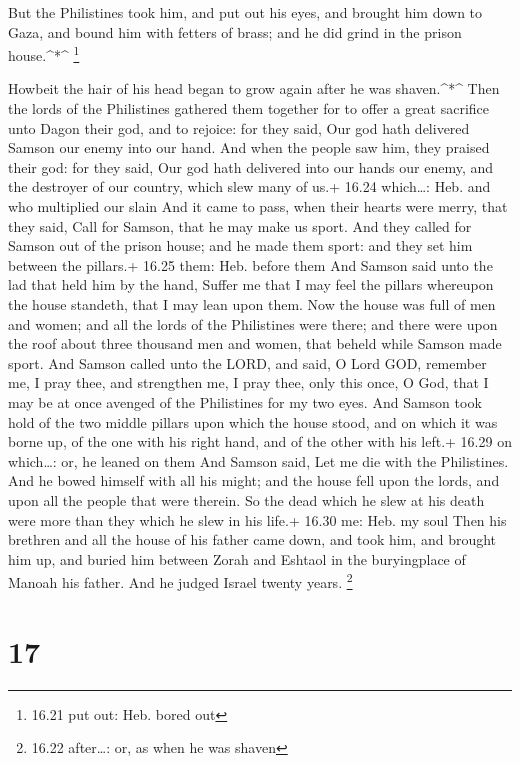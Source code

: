  But the Philistines took him, and put out his eyes, and
brought him down to Gaza, and bound him with fetters of brass; and he
did grind in the prison house.\^{}*\^{} \footnote{16.21 put out: Heb.
  bored out}

 Howbeit the hair of his head began to grow again after he
was shaven.\^{}*\^{}  Then the lords of the Philistines
gathered them together for to offer a great sacrifice unto Dagon their
god, and to rejoice: for they said, Our god hath delivered Samson our
enemy into our hand.  And when the people saw him, they
praised their god: for they said, Our god hath delivered into our hands
our enemy, and the destroyer of our country, which slew many of us.+
16.24 which\ldots: Heb. and who multiplied our slain  And
it came to pass, when their hearts were merry, that they said, Call for
Samson, that he may make us sport. And they called for Samson out of the
prison house; and he made them sport: and they set him between the
pillars.+ 16.25 them: Heb. before them  And Samson said
unto the lad that held him by the hand, Suffer me that I may feel the
pillars whereupon the house standeth, that I may lean upon them.
 Now the house was full of men and women; and all the lords
of the Philistines were there; and there were upon the roof about three
thousand men and women, that beheld while Samson made sport.
 And Samson called unto the LORD, and said, O Lord GOD,
remember me, I pray thee, and strengthen me, I pray thee, only this
once, O God, that I may be at once avenged of the Philistines for my two
eyes.  And Samson took hold of the two middle pillars upon
which the house stood, and on which it was borne up, of the one with his
right hand, and of the other with his left.+ 16.29 on which\ldots: or,
he leaned on them  And Samson said, Let me die with the
Philistines. And he bowed himself with all his might; and the house fell
upon the lords, and upon all the people that were therein. So the dead
which he slew at his death were more than they which he slew in his
life.+ 16.30 me: Heb. my soul  Then his brethren and all
the house of his father came down, and took him, and brought him up, and
buried him between Zorah and Eshtaol in the buryingplace of Manoah his
father. And he judged Israel twenty years. \footnote{16.22 after\ldots:
  or, as when he was shaven}

\hypertarget{section-16}{%
\section{17}\label{section-16}}

